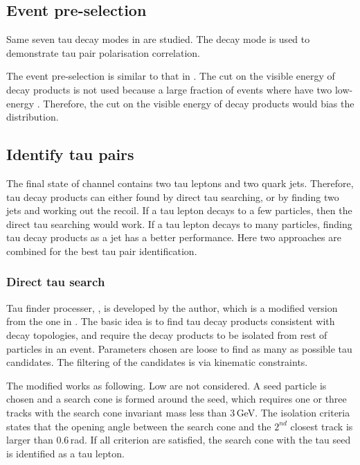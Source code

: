 \subsection{Event pre-selection}

Same seven tau decay modes in  are studied. The \tauToPion decay mode is used to demonstrate tau pair polarisation correlation.

The event pre-selection is similar to that in . The cut on the visible energy of decay products is not used because a large fraction of \ZToTauTau events where \tauToPion have two low-energy \Ppipm. Therefore, the cut on the visible energy of decay products would bias the distribution.


\subsection{Identify tau pairs}

The final state of \HepProcess{\Pep \Pem \to \PZ \PZ} channel contains two tau leptons and two quark jets. Therefore, tau decay products can either found by direct tau searching, or by finding two jets and working out the recoil. If a tau lepton decays to a few particles, then the direct tau searching would work. If a tau lepton decays to many particles, finding tau decay products as a jet has a better performance. Here two approaches are combined for the best tau pair identification.

\subsubsection{Direct tau search}
Tau finder processer, \BonoTauFinder, is developed by the author, which is a modified version from the one in . The basic idea is to find tau decay products consistent with decay topologies, and require the decay products to be isolated from rest of particles in an event. Parameters chosen are loose to find as many as possible tau candidates. The filtering of the candidates is via kinematic constraints.

The modified \BonoTauFinder works as following. Low \pT are not considered. A seed particle is chosen and a search cone is formed around the seed, which requires one or three tracks with the search cone invariant mass less than 3\,GeV. The isolation criteria states that the opening angle between the search cone  and the $2^{nd}$ closest track is larger than 0.6\,rad. If all criterion are satisfied,  the search cone with the tau seed is identified as a tau lepton.

